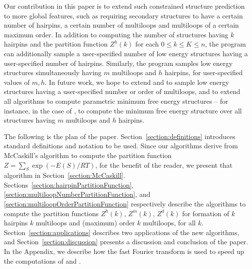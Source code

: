 Our contribution in this paper is to extend such constrained structure
prediction to more global features, such as requiring secondary structures
to have a certain number of hairpins, a certain number of multiloops and
multiloops of a certain maximum order.  In addition to computing the
number of structures having $k$ hairpins and the partition function $Z^h(k)$
for each $0 \leq k \leq K \leq n$, the program {\rnahairpin} can
additionally sample a user-specified number of low energy structures having a
user-specified number of hairpins.  Similarly, the program {\rnahairpinml}
samples low energy structures simultaneously having $m$ multiloops and
$h$ hairpins, for user-specified values of $m,h$.  In future work,
we hope to extend
{\rnamlnumber} and {\rnamlorder} to sample low energy structures having
a user-specified number or order of multiloops, and to extend all algorithms
to compute parametric minimum free energy structures -- for instance, in the
case of {\rnahairpinml}, to compute the minimum free energy structure over
all structures having $m$ multiloops and $h$ hairpins.

The following is the plan of the paper.
Section~\ref{section:definitions} introduces standard definitions and
notation to be used. Since our algorithms derive from
McCaskill's algorithm \cite{mcCaskill} to compute the partition function
$Z= \sum_{S} \exp(-E(S)/RT)$, for the benefit of the reader, we present
that algorithm in Section~\ref{section:McCaskill}.
Sections~\ref{section:hairpinPartitionFunction},
\ref{section:multiloopNumberPartitionFunction}, and
\ref{section:multiloopOrderPartitionFunction}
respectively describe the algorithms to compute the partition functions
$Z^h(k)$, $Z^m(k)$, $Z^d(k)$ for formation of $k$ hairpins
$k$ multiloops and (maximum) order $k$ multiloops, for all $k$.
Section~\ref{section:applications} describes two applications of the
new algorithms, and Section~\ref{section:discussion} presents a
discussion and conclusion of the paper. In the Appendix, we describe
how the fast Fourier transform is used to speed up the computations of
{\rnahairpin} and {\rnamlnumber}.




